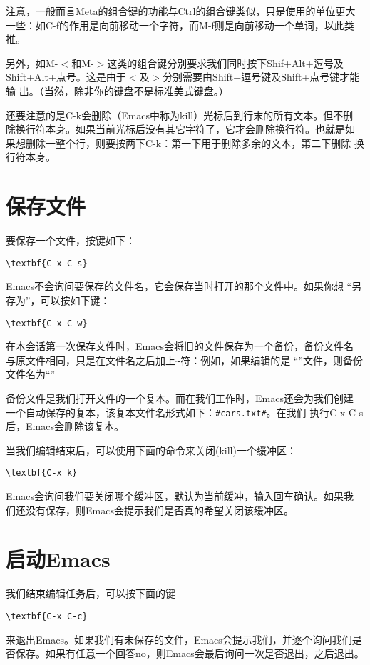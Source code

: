 注意，一般而言Meta的组合键的功能与Ctrl的组合键类似，只是使用的单位更大
一些：如C-f的作用是向前移动一个字符，而M-f则是向前移动一个单词，以此类
推。

另外，如M-$<$和M-$>$这类的组合键分别要求我们同时按下Shif+Alt+逗号及
Shift+Alt+点号。这是由于$<$及$>$分别需要由Shift+逗号键及Shift+点号键才能输
出。（当然，除非你的键盘不是标准美式键盘。）

还要注意的是C-k会删除（Emacs中称为kill）光标后到行末的所有文本。但不删
除换行符本身。如果当前光标后没有其它字符了，它才会删除换行符。也就是如
果想删除一整个行，则要按两下C-k：第一下用于删除多余的文本，第二下删除
换行符本身。

\section{保存文件}
\label{sec:emacs:savingFiles}
要保存一个文件，按键如下：
\begin{Verbatim}[frame=single,commandchars=\\\{\}]
\textbf{C-x C-s}
\end{Verbatim}
Emacs不会询问要保存的文件名，它会保存当时打开的那个文件中。如果你想
``另存为''，可以按如下键：
\begin{Verbatim}[frame=single,commandchars=\\\{\}]
\textbf{C-x C-w}
\end{Verbatim}

在本会话第一次保存文件时，Emacs会将旧的文件保存为一个备份，备份文件名
与原文件相同，只是在文件名之后加上\texttt{\~}符：例如，如果编辑的是
``''文件，则备份文件名为``''

备份文件是我们打开文件的一个复本。而在我们工作时，Emacs还会为我们创建
一个自动保存的复本，该复本文件名形式如下：\texttt{\#cars.txt\#}。在我们
执行C-x C-s后，Emacs会删除该复本。

当我们编辑结束后，可以使用下面的命令来关闭(kill)一个缓冲区：
\begin{Verbatim}[frame=single,commandchars=\\\{\}]
\textbf{C-x k}
\end{Verbatim}

Emacs会询问我们要关闭哪个缓冲区，默认为当前缓冲，输入回车确认。如果我
们还没有保存，则Emacs会提示我们是否真的希望关闭该缓冲区。

\section{启动Emacs}
\label{sec:emacs:quit}
我们结束编辑任务后，可以按下面的键
\begin{Verbatim}[frame=single,commandchars=\\\{\}]
\textbf{C-x C-c}
\end{Verbatim}
来退出Emacs。如果我们有未保存的文件，Emacs会提示我们，并逐个询问我们是
否保存。如果有任意一个回答no，则Emacs会最后询问一次是否退出，之后退出。




